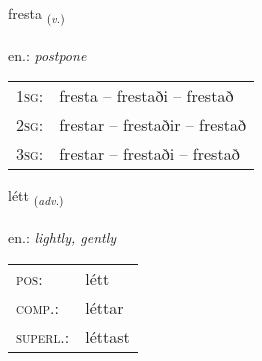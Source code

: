 \documentclass[frontgrid, backgrid]{flacards}\usepackage[]{graphicx}\usepackage[]{xcolor}
\begin{document}
\renewcommand{\flhead}{\vskip5pt \fboxsep=0pt {\small\bfseries\footnotesize Sagnorð | Verb}}
\renewcommand{\fcfoot}{\vskip5pt \fboxsep=0pt \hspace{2pt}{\small\bfseries\footnotesize 2K}}

\renewcommand{\blhead}{\vskip5pt {\small\bfseries\footnotesize Sagnorð | Verb }}
\renewcommand{\bcfoot}{\vskip5pt \hspace{2pt}{\small\bfseries\footnotesize 2K}}


{fresta \small{\textsubscript{(\textit{v.})}} \\[1ex] %
\textphonetic{[frɛsta]} \\
en.: \emph{postpone} \\  [2ex]
\renewcommand*{\arraystretch}{0.8}
\begin{tabular}{p{1cm}l}
\textsc{1sg}: & fresta -- frestaði -- frestað \\ 
\textsc{2sg}: & frestar -- frestaðir -- frestað \\ 
\textsc{3sg}: & frestar -- frestaði -- frestað \\ 
\end{tabular}
}

\renewcommand{\flhead}{\vskip5pt \fboxsep=0pt {\small\bfseries\footnotesize Atviksorð | Adverb}}
\renewcommand{\fcfoot}{\vskip5pt \fboxsep=0pt \hspace{2pt}{\small\bfseries\footnotesize 2K}}

\renewcommand{\blhead}{\vskip5pt {\small\bfseries\footnotesize Atviksorð | Adverb }}
\renewcommand{\bcfoot}{\vskip5pt \hspace{2pt}{\small\bfseries\footnotesize 2K}}


{létt \small{\textsubscript{(\textit{adv.})}} \\[1ex] %
\textphonetic{[ljɛht]} \\
en.: \emph{lightly, gently} \\  [2ex]
\renewcommand*{\arraystretch}{0.8}
\begin{tabular}{ll}
\textsc{pos}: & létt \\ 
\textsc{comp.}: & léttar \\ 
\textsc{superl.}: & léttast \\
\end{tabular}
}
\end{document}
